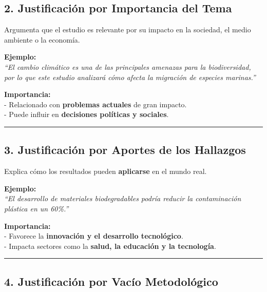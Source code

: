 \documentclass[
  letterpaper,
  DIV=11,
  numbers=noendperiod]{scrartcl}
\begin{document}
\subsection{\texorpdfstring{\textbf{2. Justificación por Importancia del
Tema}}{2. Justificación por Importancia del Tema}}\label{justificaciuxf3n-por-importancia-del-tema}

Argumenta que el estudio es relevante por su impacto en la sociedad, el
medio ambiente o la economía.

\textbf{Ejemplo:}\\
\emph{``El cambio climático es una de las principales amenazas para la
biodiversidad, por lo que este estudio analizará cómo afecta la
migración de especies marinas.''}

\textbf{Importancia:}\\
- Relacionado con \textbf{problemas actuales} de gran impacto.\\
- Puede influir en \textbf{decisiones políticas y sociales}.

\begin{center}\rule{0.5\linewidth}{0.5pt}\end{center}

\subsection{\texorpdfstring{\textbf{3. Justificación por Aportes de los
Hallazgos}}{3. Justificación por Aportes de los Hallazgos}}\label{justificaciuxf3n-por-aportes-de-los-hallazgos}

Explica cómo los resultados pueden \textbf{aplicarse} en el mundo real.

\textbf{Ejemplo:}\\
\emph{``El desarrollo de materiales biodegradables podría reducir la
contaminación plástica en un 60\%.''}

\textbf{Importancia:}\\
- Favorece la \textbf{innovación y el desarrollo tecnológico}.\\
- Impacta sectores como la \textbf{salud, la educación y la tecnología}.

\begin{center}\rule{0.5\linewidth}{0.5pt}\end{center}

\subsection{\texorpdfstring{\textbf{4. Justificación por Vacío
Metodológico}}{4. Justificación por Vacío Metodológico}}\label{justificaciuxf3n-por-vacuxedo-metodoluxf3gico}
\end{document}
